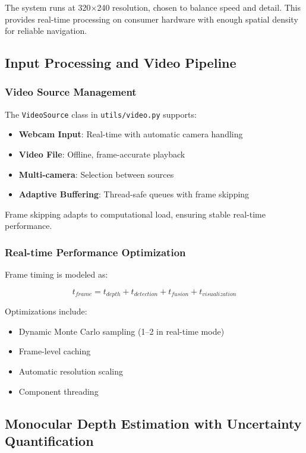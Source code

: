 \documentclass[12pt,oneside]{book}
\begin{document}
The system runs at 320$\times$240 resolution, chosen to balance speed and detail. This provides real-time processing on consumer hardware with enough spatial density for reliable navigation.

\subsection{Input Processing and Video Pipeline}

\subsubsection{Video Source Management}

The \texttt{VideoSource} class in \texttt{utils/video.py} supports:
\begin{itemize}
\item \textbf{Webcam Input}: Real-time with automatic camera handling
\item \textbf{Video File}: Offline, frame-accurate playback
\item \textbf{Multi-camera}: Selection between sources
\item \textbf{Adaptive Buffering}: Thread-safe queues with frame skipping
\end{itemize}

Frame skipping adapts to computational load, ensuring stable real-time performance.

\subsubsection{Real-time Performance Optimization}

Frame timing is modeled as:

\begin{equation}
t_{frame} = t_{depth} + t_{detection} + t_{fusion} + t_{visualization}
\label{eq:frame_timing}
\end{equation}

Optimizations include:
\begin{itemize}
\item Dynamic Monte Carlo sampling (1–2 in real-time mode)
\item Frame-level caching
\item Automatic resolution scaling
\item Component threading
\end{itemize}

\subsection{Monocular Depth Estimation with Uncertainty Quantification}
\end{document}
